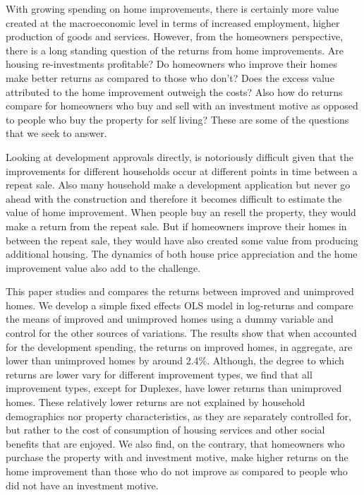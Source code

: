 \documentclass{article}
\begin{document}
With growing spending on home improvements, there is certainly more value created at the macroeconomic level in terms of increased employment, higher production of goods and services. However, from the homeowners perspective, there is a long standing question of the returns from home improvements. Are housing re-investments profitable? Do homeowners who improve their homes make better returns as compared to those who don't? Does the excess value attributed to the home improvement outweigh the costs? Also how do returns compare for homeowners who buy and sell with an investment motive as opposed to people who buy the property for self living? These are some of the questions that we seek to answer.

Looking at development approvals directly, is notoriously difficult given that the improvements for different households occur at different points in time between a repeat sale. Also many household make a development application but never go ahead with the construction and therefore it becomes difficult to estimate the value of home improvement. When people buy an resell the property, they would make a return from the repeat sale. But if homeowners improve their homes in between the repeat sale, they would have also created some value from producing additional housing. The dynamics of both house price appreciation and the home improvement value also add to the challenge.

This paper studies and compares the returns between improved and unimproved homes. We develop a simple fixed effects OLS model in log-returns and compare the means of improved and unimproved homes using a dummy variable and control for the other sources of variations. The results show that when accounted for the development spending, the returns on improved homes, in aggregate, are lower than unimproved homes by around 2.4\%. Although, the degree to which returns are lower vary for different improvement types, we find that all improvement types, except for Duplexes, have lower returns than unimproved homes. These relatively lower returns are not explained by household demographics nor property characteristics, as they are separately controlled for, but rather to the cost of consumption of housing services and other social benefits that are enjoyed. We also find, on the contrary, that homeowners who purchase the property with and investment motive, make higher returns on the home improvement than those who do not improve as compared to people who did not have an investment motive.
\end{document}
